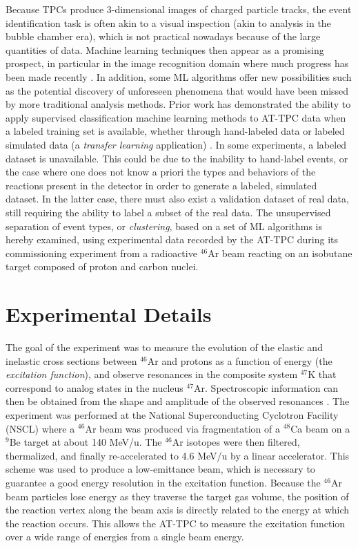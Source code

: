 \documentclass[review,number,sort&compress]{elsarticle}
\begin{document}
Because TPCs produce 3-dimensional images of charged particle tracks, the event identification task is often akin to a visual inspection (akin to analysis in the bubble chamber era), which is not practical nowadays because of the large quantities of data. Machine learning techniques then appear as a promising prospect, in particular in the image recognition domain where much progress has been made recently \cite{mehta2019}. In addition, some ML algorithms offer new possibilities such as the potential discovery of unforeseen phenomena that would have been missed by more traditional analysis methods. Prior work has demonstrated the ability to apply supervised classification machine learning methods to AT-TPC data when a labeled training set is available, whether through hand-labeled data or labeled simulated data (a {\em transfer learning} application) \cite{Kuchera2019}. In some experiments, a labeled dataset is unavailable. This could be  due to the inability to hand-label events, or the case where one does not know a priori the types and behaviors of the reactions present in the detector in order to generate a labeled, simulated dataset. In the latter case, there must also exist a validation dataset of real data, still requiring the ability to label a subset of the real data. The unsupervised separation of event types, or {\em clustering}, based on a set of ML algorithms is hereby examined, using experimental data recorded by the AT-TPC during its commissioning experiment from a radioactive $^{46}$Ar beam reacting on an isobutane target composed of proton and carbon nuclei. 

\section{Experimental Details} 
\label{Sec:Exp}
The goal of the experiment was to measure the evolution of the elastic and inelastic cross sections between $^{46}$Ar and protons as a function of energy (the {\em excitation function}), and observe resonances in the composite system $^{47}$K that correspond to analog states in the nucleus $^{47}$Ar. Spectroscopic information can then be obtained from the shape and amplitude of the observed resonances \cite{Bradt2018}. 
The experiment was performed at the National Superconducting Cyclotron Facility (NSCL) where a $^{46}$Ar beam was produced via fragmentation of a $^{48}$Ca beam on a $^9$Be target at about 140 MeV/u. The $^{46}$Ar isotopes were then filtered, thermalized, and finally re-accelerated to 4.6 MeV/u by a linear accelerator. This scheme was used to produce a low-emittance beam, which is necessary to guarantee a good energy resolution in the excitation function. Because the  $^{46}$Ar beam particles lose energy as they traverse the target gas volume, the position of the reaction vertex along the beam axis is directly related to the energy at which the reaction occurs. This allows the AT-TPC to measure the excitation function over a wide range of energies from a single beam energy.
\end{document}
